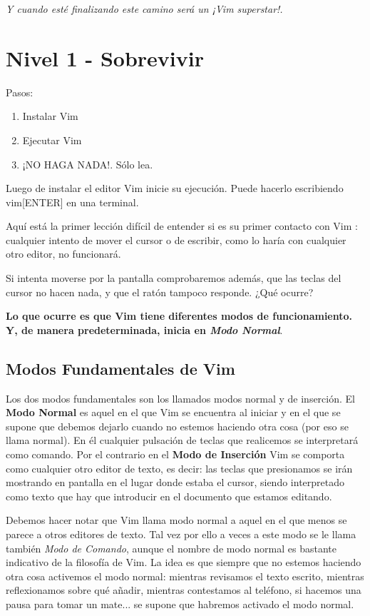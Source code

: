 \documentclass[12pt]{article}
\begin{document}
\textit{Y cuando esté finalizando este camino será un ¡Vim superstar!.}


\section{Nivel 1 - Sobrevivir}


Pasos:

\begin{enumerate}
	\item Instalar Vim
	\item Ejecutar Vim
	\item ¡NO HAGA NADA!. Sólo lea.
\end{enumerate}

Luego de instalar el editor Vim inicie su ejecución. Puede hacerlo
escribiendo vim[ENTER] en una terminal.

Aquí está la primer lección difícil de entender si es su primer contacto
con Vim : cualquier intento de mover el cursor o de escribir, como lo haría con cualquier otro
editor, no funcionará.

Si intenta moverse por la
pantalla comprobaremos además, que las teclas del cursor no hacen nada, y que el
ratón tampoco responde. ¿Qué ocurre? 

\textbf{Lo que ocurre es que Vim tiene diferentes modos de funcionamiento.
Y, de manera predeterminada, inicia en \textit{Modo Normal}}.


\subsection{Modos Fundamentales de Vim}

Los dos modos fundamentales son los llamados modos normal y de inserción. 
El \textbf{Modo Normal} es aquel
en el que Vim se encuentra al iniciar y en el que se supone que debemos
dejarlo cuando no estemos haciendo otra cosa (por eso se llama normal). En él
cualquier pulsación de teclas que realicemos se interpretará como comando. Por
el contrario en el \textbf{Modo de Inserción} Vim se comporta como cualquier
otro editor de texto, es decir: las teclas que presionamos se irán mostrando en
pantalla en el lugar donde estaba el cursor, siendo interpretado como texto que
hay que introducir en el documento que estamos editando.

Debemos hacer notar que Vim llama modo normal a aquel en el que menos se
parece a otros editores de texto. Tal vez por ello a veces a este modo se le
llama también \textit{Modo de Comando}, aunque el nombre de modo normal es bastante
indicativo de la filosofía de Vim. La idea es que siempre que no estemos
haciendo otra cosa activemos el modo normal: mientras revisamos el texto
escrito, mientras reflexionamos sobre qué añadir, mientras contestamos al
teléfono, si hacemos una pausa para tomar un mate...
se supone que habremos activado el modo normal.
\end{document}
